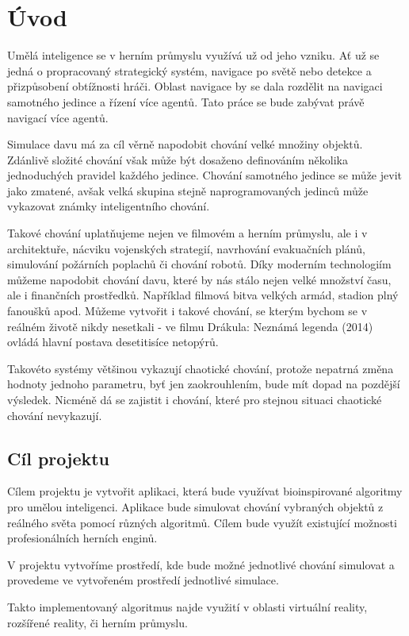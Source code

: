 \section{Úvod}
Umělá inteligence se v herním průmyslu využívá už od jeho vzniku. Ať už se jedná o propracovaný strategický systém, navigace po světě nebo detekce a přizpůsobení obtížnosti hráči. Oblast navigace by se dala rozdělit na navigaci samotného jedince a řízení více agentů. Tato práce se bude zabývat právě navigací více agentů. 
\par
Simulace davu má za cíl věrně napodobit chování velké množiny objektů. Zdánlivě složité chování však může být dosaženo definováním několika jednoduchých pravidel každého jedince. Chování samotného jedince se může jevit jako zmatené, avšak velká skupina stejně naprogramovaných jedinců může vykazovat známky inteligentního chování. 
\par
Takové chování uplatňujeme nejen ve filmovém a herním průmyslu, ale i v architektuře, nácviku vojenských strategií, navrhování evakuačních plánů, simulování požárních poplachů či chování robotů. \cite{gammaWeb} Díky moderním technologiím můžeme napodobit chování davu, které by nás stálo nejen velké množství času, ale i finančních prostředků. Například filmová bitva velkých armád, stadion plný fanoušků apod. Můžeme vytvořit i takové chování, se kterým bychom se v reálném životě nikdy nesetkali - ve filmu Drákula: Neznámá legenda (2014) ovládá hlavní postava desetitisíce netopýrů. \cite{DraculaYoutube}
\par 
Takovéto systémy většinou vykazují chaotické chování, protože nepatrná změna hodnoty jednoho parametru, byť jen zaokrouhlením, bude mít dopad na pozdější výsledek. Nicméně dá se zajistit i chování, které pro stejnou situaci chaotické chování nevykazují. 
\subsection{Cíl projektu}
Cílem projektu je vytvořit aplikaci, která bude využívat bioinspirované algoritmy pro umělou inteligenci. Aplikace bude simulovat chování vybraných objektů z reálného světa pomocí různých algoritmů. Cílem bude využít existující možnosti profesionálních herních enginů. 
\par
V projektu vytvoříme prostředí, kde bude možné jednotlivé chování simulovat a provedeme ve vytvořeném prostředí jednotlivé simulace. 
\par
Takto implementovaný algoritmus najde využití v oblasti virtuální reality, rozšířené reality, či herním průmyslu. 
